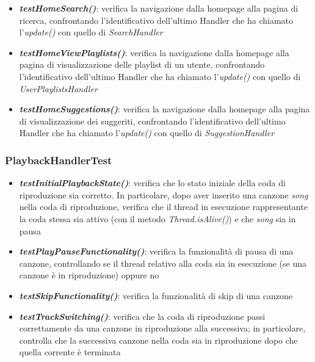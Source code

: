 \documentclass{article}
\begin{document}
  \begin{itemize}

    \item \textbf{\textit{testHomeSearch()}}: verifica la navigazione dalla homepage alla pagina di ricerca, confrontando l'identificativo dell'ultimo Handler che ha chiamato l'\textit{update()} con quello di \textit{SearchHandler}

    \item \textbf{\textit{testHomeViewPlaylists()}}: verifica la navigazione dalla homepage alla pagina di visualizzazione delle playlist di un utente, confrontando l'identificativo dell'ultimo Handler che ha chiamato l'\textit{update()} con quello di \textit{UserPlaylistsHandler}

    \item \textbf{\textit{testHomeSuggestions()}}: verifica la navigazione dalla homepage alla pagina di visualizzazione dei suggeriti, confrontando l'identificativo dell'ultimo Handler che ha chiamato l'\textit{update()} con quello di \textit{SuggestionHandler}

  \end{itemize}

  \subsubsection{PlaybackHandlerTest}
  \begin{itemize}

    \item \textbf{\textit{testInitialPlaybackState()}}: verifica che lo stato iniziale della coda di riproduzione sia corretto. In particolare,
    dopo aver inserito una canzone \textit{song} nella coda di riproduzione, verifica che il thread in esecuzione rappresentante la coda stessa sia attivo (con il metodo \textit{Thread.isAlive()}) e che \textit{song} sia in pausa

    \item \textbf{\textit{testPlayPauseFunctionality()}}: verifica la funzionalità di pausa di una canzone, controllando se il thread relativo alla coda sia in esecuzione (se una canzone è in riproduzione) oppure no

    \item \textbf{\textit{testSkipFunctionality()}}: verifica la funzionalità di skip di una canzone

    \item \textbf{\textit{testTrackSwitching()}}: verifica che la coda di riproduzione passi correttamente da una canzone in riproduzione alla successiva; in particolare, controlla che la successiva canzone nella coda sia in riproduzione dopo che quella corrente è terminata

  \end{itemize}
\end{document}
